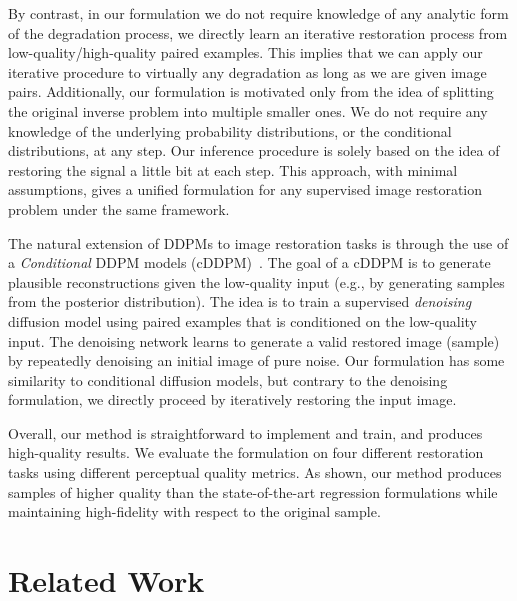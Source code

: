 \documentclass[10pt]{article} %
\begin{document}
By contrast, in our formulation we do not require knowledge of any analytic form of the degradation process, we directly learn an iterative restoration process from low-quality/high-quality paired examples. This implies that we can apply our iterative procedure to virtually any degradation as long as we are given image pairs. Additionally, our formulation is motivated only from the idea of splitting the original inverse problem into multiple smaller ones. We do not require any knowledge of the underlying probability distributions, or the conditional distributions, at any step. Our inference procedure is solely based on the idea of restoring the signal a little bit at each step.  This approach, with minimal assumptions, gives a unified formulation for any supervised image restoration problem under the same framework.  

The natural extension of DDPMs to image restoration tasks is through the use of a \emph{Conditional} DDPM models (cDDPM)~\citep{li2021srdiff,saharia2021image,saharia2022palette,whang2022deblurring}. The goal of a cDDPM is to generate plausible reconstructions given the low-quality input (e.g., by generating samples from the posterior distribution). The idea is to train a supervised \emph{denoising} diffusion model using paired examples that is conditioned on the low-quality input. The denoising network learns to generate a valid restored image (sample) by repeatedly denoising an initial image of pure noise. Our formulation has some similarity to conditional diffusion models, but contrary to the denoising formulation, we directly proceed by iteratively restoring the input image. 

Overall, our method is straightforward to implement and train, and produces high-quality results.  We evaluate the formulation on four different restoration tasks using different perceptual quality metrics. As shown, our method produces samples of higher quality than the state-of-the-art regression formulations while maintaining high-fidelity with respect to the original sample.


\section{Related Work}
\end{document}

